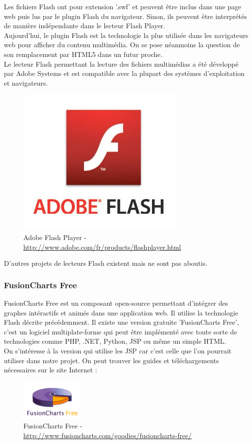 Les fichiers Flash ont pour extension '.swf' et peuvent être inclus dans une page web puis lus par le plugin Flash du navigateur. Sinon, ils peuvent être interprétés de manière indépendante dans le lecteur Flash Player.\\
Aujourd'hui, le plugin Flash est la technologie la plus utilisée dans les navigateurs web pour afficher du contenu multimédia. On se pose néanmoins la question de son remplacement par HTML5 dans un futur proche.\\
Le lecteur Flash permettant la lecture des fichiers multimédias a été développé par Adobe Systems et est compatible avec la plupart des systèmes d'exploitation et navigateurs.
\begin{figure}[H]
  \center
  \includegraphics[scale=0.4]{../graph/flashAdobe.jpg}
  \caption{Adobe Flash Player - \url{http://www.adobe.com/fr/products/flashplayer.html}}
\end{figure}
D'autres projets de lecteurs Flash existent mais ne sont pas aboutis.

\subsubsection{FusionCharts Free}
FusionCharts Free est un composant open-source permettant d'intégrer des graphes intéractifs et animés dans une application web. Il utilise la technologie Flash décrite précédemment. Il existe une version gratuite 'FusionCharts Free', c'est un logiciel multiplate-forme qui peut être implémenté avec toute sorte de technologies comme PHP, .NET, Python, JSP ou même un simple HTML.\\

On s'intéresse à la version qui utilise les JSP car c'est celle que l'on pourrait utiliser dans notre projet.
On peut trouver les guides et téléchargements nécessaires sur le site Internet :
\begin{figure}[H]
  \center
  \includegraphics[scale=0.7]{../graph/fusionCharts.png}
  \caption{FusionCharts Free - \url{http://www.fusioncharts.com/goodies/fusioncharts-free/}}
\end{figure}

